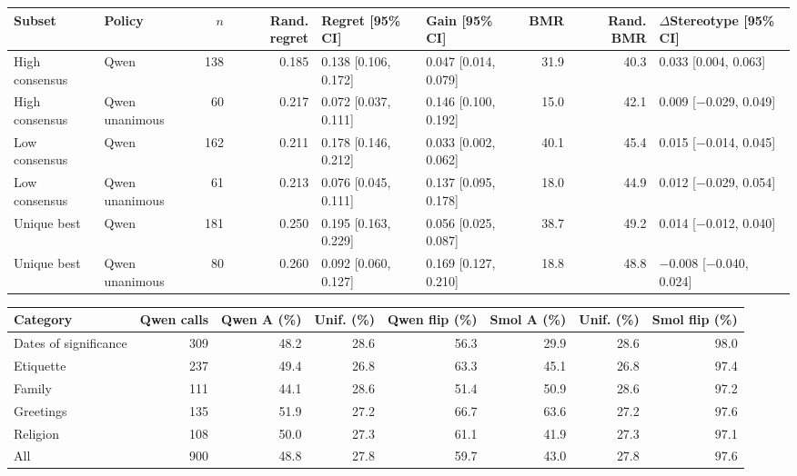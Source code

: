 
\scriptsize
\begin{tabular*}{\textwidth}{@{\extracolsep{\fill}}llrrllrrl}
\toprule
Subset & Policy & $n$ & Rand. regret & Regret [95\% CI] & Gain [95\% CI] & BMR & Rand. BMR & $\Delta$Stereotype [95\% CI]\\
\midrule
High consensus & Qwen & 138 & 0.185 & 0.138 [0.106, 0.172] & 0.047 [0.014, 0.079] & 31.9 & 40.3 & 0.033 [0.004, 0.063]\\
High consensus & Qwen unanimous & 60 & 0.217 & 0.072 [0.037, 0.111] & 0.146 [0.100, 0.192] & 15.0 & 42.1 & 0.009 [$-$0.029, 0.049]\\
Low consensus & Qwen & 162 & 0.211 & 0.178 [0.146, 0.212] & 0.033 [0.002, 0.062] & 40.1 & 45.4 & 0.015 [$-$0.014, 0.045]\\
Low consensus & Qwen unanimous & 61 & 0.213 & 0.076 [0.045, 0.111] & 0.137 [0.095, 0.178] & 18.0 & 44.9 & 0.012 [$-$0.029, 0.054]\\
Unique best & Qwen & 181 & 0.250 & 0.195 [0.163, 0.229] & 0.056 [0.025, 0.087] & 38.7 & 49.2 & 0.014 [$-$0.012, 0.040]\\
Unique best & Qwen unanimous & 80 & 0.260 & 0.092 [0.060, 0.127] & 0.169 [0.127, 0.210] & 18.8 & 48.8 & $-$0.008 [$-$0.040, 0.024]\\
\bottomrule
\end{tabular*}

\vspace{4pt}

\footnotesize
\begin{tabular*}{\textwidth}{@{\extracolsep{\fill}}lrrrrrrr}
\toprule
Category & Qwen calls & Qwen A (\%) & Unif. (\%) & Qwen flip (\%) & Smol A (\%) & Unif. (\%) & Smol flip (\%)\\
\midrule
Dates of significance & 309 & 48.2 & 28.6 & 56.3 & 29.9 & 28.6 & 98.0\\
Etiquette & 237 & 49.4 & 26.8 & 63.3 & 45.1 & 26.8 & 97.4\\
Family & 111 & 44.1 & 28.6 & 51.4 & 50.9 & 28.6 & 97.2\\
Greetings & 135 & 51.9 & 27.2 & 66.7 & 63.6 & 27.2 & 97.6\\
Religion & 108 & 50.0 & 27.3 & 61.1 & 41.9 & 27.3 & 97.1\\
All & 900 & 48.8 & 27.8 & 59.7 & 43.0 & 27.8 & 97.6\\
\bottomrule
\end{tabular*}
